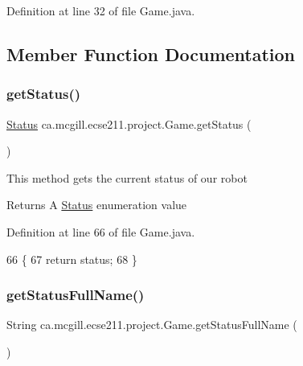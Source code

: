 Definition at line 32 of file Game.\+java.



\subsection{Member Function Documentation}
\mbox{\label{enumca_1_1mcgill_1_1ecse211_1_1project_1_1_game_a620374b3eeb3dd7e0abd26f3ced9053b}} 
\subsubsection{\texorpdfstring{get\+Status()}{getStatus()}}
{\footnotesize\ttfamily \hyperlink{enumca_1_1mcgill_1_1ecse211_1_1project_1_1_game_1_1_status}{Status} ca.\+mcgill.\+ecse211.\+project.\+Game.\+get\+Status (\begin{DoxyParamCaption}{ }\end{DoxyParamCaption})}

This method gets the current status of our robot

\begin{DoxyReturn}{Returns}
A \hyperlink{enumca_1_1mcgill_1_1ecse211_1_1project_1_1_game_1_1_status}{Status} enumeration value 
\end{DoxyReturn}


Definition at line 66 of file Game.\+java.


\begin{DoxyCode}
66                             \{
67     \textcolor{keywordflow}{return} status;
68   \}
\end{DoxyCode}
\mbox{\label{enumca_1_1mcgill_1_1ecse211_1_1project_1_1_game_a43a5763d183e0bcacd402c872c07273e}} 
\subsubsection{\texorpdfstring{get\+Status\+Full\+Name()}{getStatusFullName()}}
{\footnotesize\ttfamily String ca.\+mcgill.\+ecse211.\+project.\+Game.\+get\+Status\+Full\+Name (\begin{DoxyParamCaption}{ }\end{DoxyParamCaption})}

